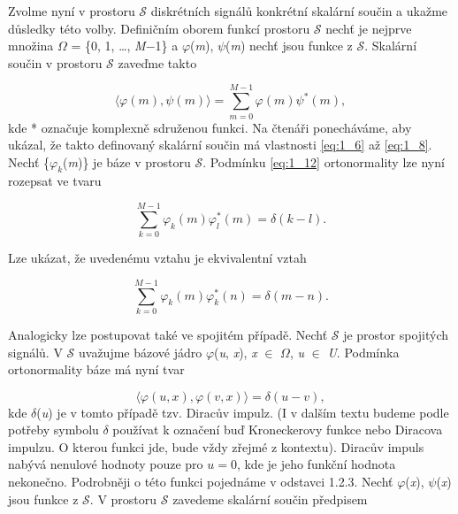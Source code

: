 Zvolme nyní v prostoru $\mathscr{S}$ diskrétních signálů konkrétní skalární součin a ukažme důsledky této volby. Definičním oborem funkcí prostoru $\mathscr{S}$ nechť je nejprve množina $\Omega$ = \{0, 1, \dots, \textit{M}$-$1\} a $\varphi$(\textit{m}), $\psi$(\textit{m}) nechť jsou funkce z $\mathscr{S}$. Skalární součin v prostoru $\mathscr{S}$ zaveďme takto

\begin{equation} \label{eq:1_14}
    \langle \varphi(m), \psi(m) \rangle = \sum\limits_{m=0}^{M-1} \varphi (m) \psi^*(m),
\end{equation}
kde * označuje komplexně sdruženou funkci. Na čtenáři ponecháváme, aby ukázal, že takto definovaný skalární součin má vlastnosti \eqref{eq:1_6} až \eqref{eq:1_8}. Nechť \{$\varphi_k$(\textit{m})\} je báze v prostoru $\mathscr{S}$. Podmínku \eqref{eq:1_12} ortonormality lze nyní rozepsat ve tvaru

\begin{equation} \label{eq:1_15}
    \sum\limits_{k=0}^{M-1} \varphi_k (m) \varphi_l^*(m) = \delta(k - l).
\end{equation}

Lze ukázat, že uvedenému vztahu je ekvivalentní vztah

\begin{equation} \label{eq:1_16}
    \sum\limits_{k=0}^{M-1} \varphi_k (m) \varphi_k^*(n) = \delta(m-n).
\end{equation}

Analogicky lze postupovat také ve spojitém případě. Nechť $\mathscr{S}$ je prostor spojitých signálů. V $\mathscr{S}$ uvažujme bázové jádro $\varphi$(\textit{u}, \textit{x}), \textit{x} $\in$ $\Omega$, \textit{u} $\in$ \textit{U}. Podmínka ortonormality báze má nyní tvar

\begin{equation} \label{eq:1_17}
    \langle \varphi(u, x), \varphi(v, x) \rangle = \delta(u - v),
\end{equation}
kde $\delta$(\textit{u}) je v tomto případě tzv. Diracův impulz. (I v dalším textu budeme podle potřeby symbolu $\delta$ používat k označení buď Kroneckerovy funkce nebo Diracova impulzu. O kterou funkci jde, bude vždy zřejmé z kontextu). Diracův impuls nabývá nenulové hodnoty pouze pro $u = 0$, kde je jeho funkční hodnota nekonečno. Podrobněji o této funkci pojednáme v odstavci 1.2.3. Nechť $\varphi$(\textit{x}), $\psi$(\textit{x}) jsou funkce z $\mathscr{S}$. V prostoru $\mathscr{S}$ zavedeme skalární součin předpisem

